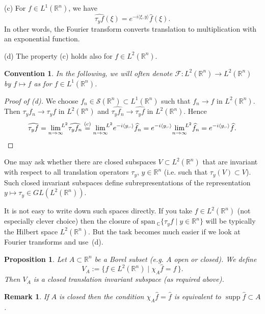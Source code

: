 \documentclass[12pt, oneside, a4paper]{article}
\newtheorem{prop}[thm]{Proposition}
\def\supp{\operatorname{supp}}
\theoremstyle{dfn}
\newtheorem{rem}[thm]{Remark}
\newtheorem{convention}{Convention}
\newcommand{\scalprod}[2]{\langle #1,#2 \rangle}
\def \S {\ensuremath{\mathcal{S}}}
\def \S {\ensuremath{\mathcal{S}}}
\def\Rbb{\ensuremath{\mathbb{R}}}
\newcommand{\Fcal}{\mathcal{F}}
\newcommand{\Com}{\mathbb{C}}
\newcommand{\spans}{\text{span}\ }
\begin{document}
(c) For $f \in L^1(\Rbb^n)$, we have
\[
\widehat{\tau_y f} (\xi) = e^{-i\scalprod{\xi}{y}} \widehat{f}(\xi).
\]
In other words, the Fourier transform converts translation to multiplication with an exponential function.

(d) The property (c) holds also for $f \in L^2(\Rbb^n)$.

\begin{convention}
In the following, we will often denote $\Fcal: L^2(\Rbb^n) \to L^2(\Rbb^n)$ by $f \mapsto \widehat{f}$ as for $f \in L^1(\Rbb^n)$.
\end{convention}

\begin{proof}[Proof of \emph{(d)}]
We choose $f_n \in \S(\Rbb^n) \subset L^1(\Rbb^n)$ such that $f_n \to f$ in $L^2(\Rbb^n)$. Then $\tau_y f_n \to \tau_y f$ in $L^2(\Rbb^n)$ and $\widehat{\tau_y f_n} \to \widehat{\tau_y f}$ in $L^2(\Rbb^n)$. Hence
\[
\widehat{\tau_y f}
= {\lim_{n\to\infty}}^{\!\!L^2} \widehat{\tau_y f_n}
\overset{\text{(c)}}{=} {\lim_{n\to\infty}}^{\!\!L^2} e^{-i\scalprod{y}{.}} \widehat{f}_n
= e^{-i\scalprod{y}{.}} {\lim_{n\to\infty}}^{\!\!L^2} \widehat{f}_n
= e^{-i\scalprod{y}{.}} \widehat{f}.
\qedhere
\]
\end{proof}

One may ask whether there are closed subspaces $V \subset L^2(\Rbb^n)$ that are invariant with respect to all translation operators $\tau_y$, $y \in \Rbb^n$ (i.e. such that $\tau_y(V) \subset V$). Such closed invariant subspaces define subrepresentations of the representation $y \mapsto \tau_y \in GL(L^2(\Rbb^n))$.

It is not easy to write down such spaces directly. If you take $f \in L^2(\Rbb^n)$ (not especially clever choice) then the closure of $\spans_\Com\{\tau_y f \mid y \in \Rbb^n \}$ will be typically the Hilbert space $L^2(\Rbb^n)$. But the task becomes much easier if we look at Fourier transforms and use~(d).

\begin{prop}\label{Prop:TranslationInvariantSubspaces}
Let $A \subset \Rbb^n$ be a Borel subset (e.g. $A$ open or closed). We define
\[
V_A := \{f \in L^2(\Rbb^n) \mid \chi_A \widehat{f} = \widehat{f} \,\}.
\]
Then $V_A$ is a closed translation invariant subspace (as required above).
\end{prop}

\begin{rem}
If $A$ is closed then the condition $\chi_A \widehat{f} = \widehat{f}$ is equivalent to $\supp \widehat{f} \subset A$.
\end{rem}
\end{document}
